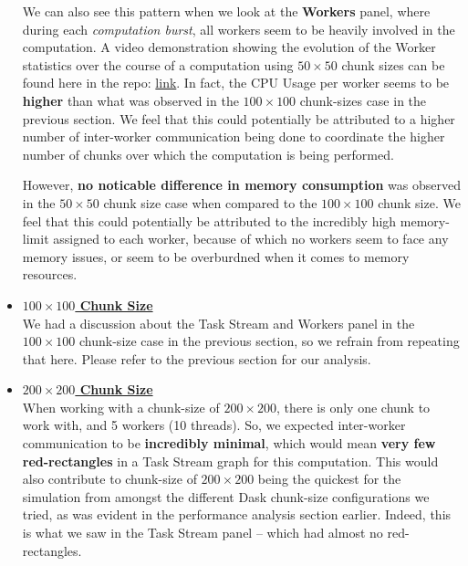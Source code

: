 \documentclass[a4paper,12pt]{article}
\begin{document}
\begin{itemize}
We can also see this pattern when we look at the \textbf{Workers} panel, where during each \textit{computation burst}, all workers seem to be heavily involved in the computation. A video demonstration showing the evolution of the Worker statistics over the course of a computation using $50 \times 50$ chunk sizes can be found here in the repo: \href{https://github.com/paulmyr/DD2358-HPC25/tree/master/04_parallel/bonus#chunk-size-50}{link}. In fact, the CPU Usage per worker seems to be \textbf{higher} than what was observed in the $100 \times 100$ chunk-sizes case in the previous section. We feel that this could potentially be attributed to a higher number of inter-worker communication being done to coordinate the higher number of chunks over which the computation is being performed. 

However, \textbf{no noticable difference in memory consumption} was observed in the $50 \times 50$ chunk size case when compared to the $100 \times 100$ chunk size. We feel that this could potentially be attributed to the incredibly high memory-limit assigned to each worker, because of which no workers seem to face any memory issues, or seem to be overburdned when it comes to memory resources. 

\item \textbf{\underline{$100 \times 100$ Chunk Size}} \\
We had a discussion about the Task Stream and Workers panel in the $100 \times 100$ chunk-size case in the previous section, so we refrain from repeating that here. Please refer to the previous section for our analysis.

\item \textbf{\underline{$200 \times 200$ Chunk Size}} \\
When working with a chunk-size of $200 \times 200$, there is only one chunk to work with, and 5 workers (10 threads). So, we expected inter-worker communication to be \textbf{incredibly minimal}, which would mean \textbf{very few red-rectangles} in a Task Stream graph for this computation. This would also contribute to chunk-size of $200 \times 200$ being the quickest for the simulation from amongst the different Dask chunk-size configurations we tried, as was evident in the performance analysis section earlier. Indeed, this is what we saw in the Task Stream panel -- which had almost no red-rectangles.


\end{itemize}
\end{document}
